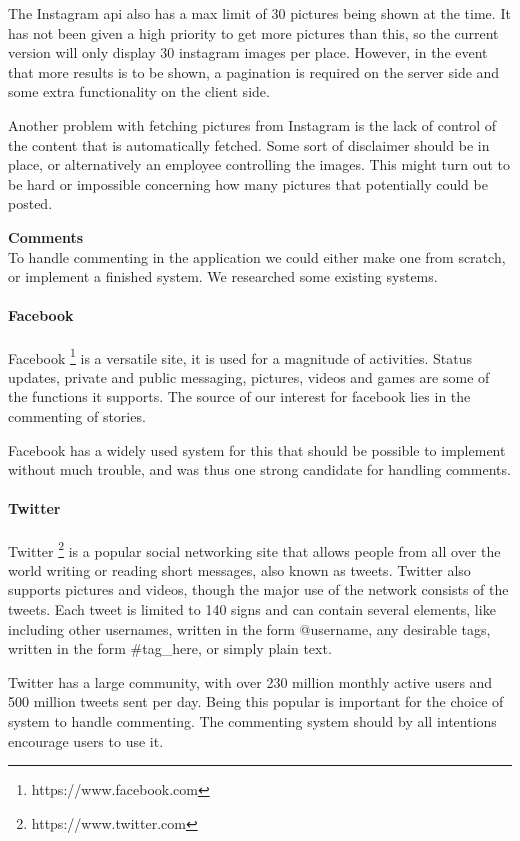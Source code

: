 \documentclass[11pt]{book}
\begin{document}
The Instagram \gls{api} also has a max limit of 30 pictures being shown at the time. It has not been given a high priority to get more pictures than this, so the current version will only display 30 instagram images per place. However, in the event that more results is to be shown, a pagination is required on the server side and some extra functionality on the client side.

Another problem with fetching pictures from Instagram is the lack of control of the content that is automatically fetched. Some sort of disclaimer should be in place, or alternatively an employee controlling the images. This might turn out to be hard or impossible concerning how many pictures that potentially could be posted.

\textbf{Comments}\\
To handle commenting in the application we could either make one from scratch, or implement a finished system. We researched some existing systems.

\paragraph{Facebook}
Facebook \footnote{https://www.facebook.com} is a versatile site, it is used for a magnitude of activities. Status updates, private and public messaging, pictures, videos and games are some of the functions it supports. The source of our interest for facebook lies in the commenting of stories. 

Facebook has a widely used system for this that should be possible to implement without much trouble, and was thus one strong candidate for handling comments.

\paragraph{Twitter}
Twitter \footnote{https://www.twitter.com} is a popular social networking site that allows people from all over the world writing or reading short messages, also known as tweets. Twitter also supports pictures and videos, though the major use of the network consists of the tweets. Each tweet is limited to 140 signs and can contain several elements, like including other usernames, written in the form @username, any desirable tags, written in the form \#tag\_here, or simply plain text. 

Twitter has a large community, with over 230 million monthly active users and 500 million tweets sent per day\cite{aboutTwitter}. Being this popular is important for the choice of system to handle commenting. The commenting system should by all intentions encourage users to use it.
\end{document}
